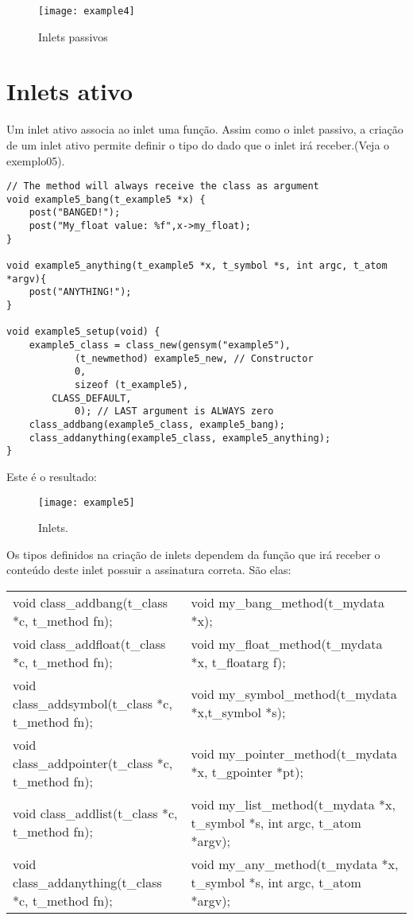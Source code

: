 \begin{figure}[h!]
	\centering
	\texttt{[image: example4]}
	\caption{Inlets passivos}
\end{figure}

\section{Inlets ativo}
Um inlet ativo associa ao inlet uma função. Assim como o inlet passivo, a
criação de um inlet ativo permite definir o tipo do dado que o inlet irá
receber.(Veja o exemplo05).

\begin{lstlisting}
// The method will always receive the class as argument
void example5_bang(t_example5 *x) { 
    post("BANGED!");
    post("My_float value: %f",x->my_float);
}

void example5_anything(t_example5 *x, t_symbol *s, int argc, t_atom *argv){
	post("ANYTHING!");
}

void example5_setup(void) {
    example5_class = class_new(gensym("example5"),
            (t_newmethod) example5_new, // Constructor
            0, 
            sizeof (t_example5),
	    CLASS_DEFAULT,
            0); // LAST argument is ALWAYS zero
    class_addbang(example5_class, example5_bang);
    class_addanything(example5_class, example5_anything);
}
\end{lstlisting}

Este é o resultado:

\begin{figure}[h!]
	\centering
	\texttt{[image: example5]}
	\caption{Inlets.}
\end{figure}

Os tipos definidos na criação de inlets dependem da função que irá receber o
conteúdo deste inlet possuir a assinatura correta. São elas:

\begin{table}[ht]
\centering
\begin{tabular}{ll}
\hline
\hline
void class\_addbang(t\_class *c, t\_method fn); 	& void my\_bang\_method(t\_mydata *x); \\
void class\_addfloat(t\_class *c, t\_method fn);	& void my\_float\_method(t\_mydata *x, t\_floatarg f); \\
void class\_addsymbol(t\_class *c, t\_method fn);	& void my\_symbol\_method(t\_mydata *x,t\_symbol *s); \\
void class\_addpointer(t\_class *c, t\_method fn);	& void my\_pointer\_method(t\_mydata *x, t\_gpointer *pt); \\
void class\_addlist(t\_class *c, t\_method fn);		& void my\_list\_method(t\_mydata *x, t\_symbol *s, int argc, t\_atom *argv); \\
void class\_addanything(t\_class *c, t\_method fn);	& void my\_any\_method(t\_mydata *x, t\_symbol *s, int argc, t\_atom *argv); \\
\hline
\hline
\end{tabular}
\end{table}

